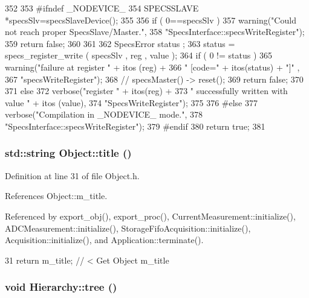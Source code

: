\begin{DoxyCode}
352                                                            {
353 #ifndef _NODEVICE_
354   SPECSSLAVE *specsSlv=specsSlaveDevice();
355 
356   if ( 0==specsSlv  ){
357     warning("Could not reach proper SpecsSlave/Master.",
358             "SpecsInterface::specsWriteRegister");
359     return false;
360   }
361   
362   SpecsError status ;
363   status = specs_register_write ( specsSlv , reg , value ); 
364   if ( 0 != status ){
365     warning("failure at register " + itos (reg) +
366             " [code=" + itos(status) + "]" ,
367             "specsWriteRegister");
368     //    specsMaster() -> reset();
369     return false;
370   }
371   else {
372     verbose("register " + itos(reg) +
373             " successfully written with value " + itos (value),
374             "SpecsWriteRegister");
375   }
376 #else
377   verbose("Compilation in _NODEVICE_ mode.",
378           "SpecsInterface::specsWriteRegister");
379 #endif
380   return true;
381 }
\end{DoxyCode}
\hypertarget{classObject_a73a0f1a41828fdd8303dd662446fb6c3}{
\subsubsection[{title}]{\setlength{\rightskip}{0pt plus 5cm}std::string Object::title ()}}
\label{classObject_a73a0f1a41828fdd8303dd662446fb6c3}


Definition at line 31 of file Object.h.

References Object::m\_\-title.

Referenced by export\_\-obj(), export\_\-proc(), CurrentMeasurement::initialize(), ADCMeasurement::initialize(), StorageFifoAcquisition::initialize(), Acquisition::initialize(), and Application::terminate().


\begin{DoxyCode}
31 { return m_title;      } // < Get Object m_title
\end{DoxyCode}
\hypertarget{classHierarchy_a594c294c5f60c230e106d522ed008212}{
\subsubsection[{tree}]{\setlength{\rightskip}{0pt plus 5cm}void Hierarchy::tree ()}}
\label{classHierarchy_a594c294c5f60c230e106d522ed008212}


